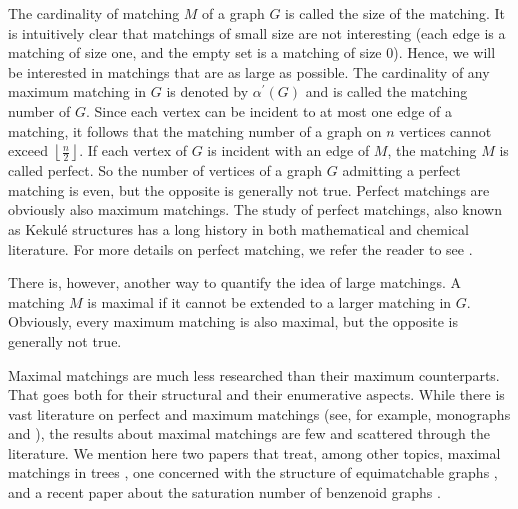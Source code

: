 \documentclass[11pt]{article}
\begin{document}
The cardinality of matching $M$ of a graph $G$ is called the size of the matching. It is intuitively clear that matchings of small size are not interesting (each edge is a matching of size one, and the empty set is a matching of size $0$). Hence, we will be interested in matchings that are as large as possible. The cardinality of any maximum matching in $G$ is denoted by 
$\alpha^{\prime}(G)$ and is called the matching number of $G$. Since each vertex can be incident to at most one edge of 
a matching, it follows that the matching number of a graph on $n$ vertices cannot exceed $\left\lfloor\frac{n}{2}\right\rfloor$. If each vertex of $G$ is incident with an edge of $M$, the matching $M$ is called perfect. So the number of vertices of a graph $G$ admitting a perfect matching is even, but the opposite is generally not true.
Perfect matchings are obviously also maximum matchings. The study of perfect matchings, also known as Kekul\'e structures has a long history in both mathematical and chemical literature. For more details on perfect matching, we refer the reader to see \cite{Lov}. 

There is, however, another way to quantify the idea of large matchings. A matching $M$ is maximal if it cannot be extended to a larger matching in $G$. Obviously, every maximum matching is also maximal, but the opposite is generally not true.

Maximal matchings are much less researched than their maximum counterparts. That goes both for their structural and their enumerative aspects. While there is vast literature on perfect and maximum matchings (see, for example, monographs \cite{Lov} and \cite{Cyv}), the results about maximal matchings are few and scattered through the literature. We mention here two papers that treat, among other topics, maximal matchings in trees \cite{Kla, Wan}, one concerned with the structure of equimatchable graphs \cite{Fre}, and a recent paper about the saturation number of benzenoid graphs \cite{Dos}.

\end{document}
